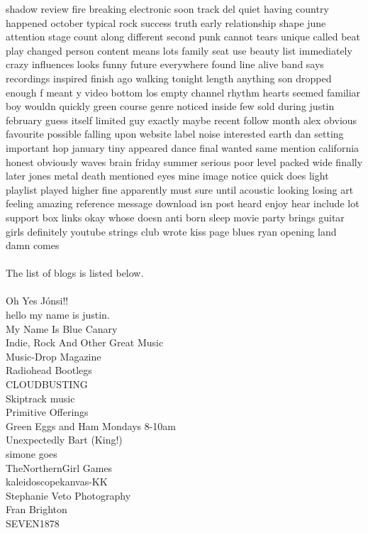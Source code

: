 \documentclass[10pt,letterpaper]{article}
\begin{document}
	shadow	review	fire	breaking	electronic	soon	track	del	quiet	having	country	happened	october	typical	rock	success	truth	early	relationship	shape	june	attention	stage	count	along	different	second	punk	cannot	tears unique	called	beat	play	changed	person	content	means	lots	family	seat	use	beauty	list	immediately	crazy	influences	looks	funny	future	everywhere	found	line	alive	band	says	recordings	inspired	finish	ago	walking	tonight	length	anything	son	dropped	enough	f	meant	y	video	bottom	los	empty	channel	rhythm	hearts	seemed	familiar	boy	wouldn	quickly	green	course	genre	noticed	inside	few	sold	during	justin	february	guess	itself	limited	guy	exactly	maybe	recent	follow	month	alex	obvious	favourite	possible	falling	upon	website	label	noise	interested	earth	dan	setting	important	hop	january	tiny	appeared	dance	final	wanted	same	mention	california	honest	obviously	waves	brain	friday	summer	serious	poor	level	packed	wide	finally	later	jones	metal	death	mentioned	eyes	mine	image	notice	quick	does	light	playlist	played	higher	fine	apparently	must	sure	until	acoustic	looking	losing	art	feeling	amazing	reference	message	download	isn	post	heard	enjoy	hear	include	lot	support	box	links	okay	whose	doesn	anti	born 	sleep	movie	party	brings	guitar	girls	definitely	youtube	strings	club	wrote	kiss	page	blues	ryan	opening	land	damn	comes\\
\\
The list of blogs is listed below.\\
\\
Oh Yes Jónsi!!\\	
hello my name is justin.\\ 
My Name Is Blue Canary\\
Indie, Rock And Other Great Music\\
Music-Drop Magazine\\
Radiohead Bootlegs\\
CLOUDBUSTING\\
Skiptrack music\\
Primitive Offerings\\
Green Eggs and Ham Mondays 8-10am\\
Unexpectedly Bart (King!)\\
simone goes\\
TheNorthernGirl Games\\
kaleidoscopekanvas-KK\\
Stephanie Veto Photography\\
Fran Brighton\\
SEVEN1878\\
\end{document}
